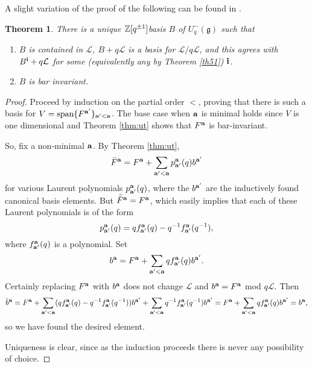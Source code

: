 \documentclass[11pt]{amsart}
\numberwithin{equation}{section}
\newtheorem{Theorem}{Theorem}[section]
\theoremstyle{definition}
\newcommand{\g}{\mathfrak{g}}
\begin{document}
A slight variation of the proof of the following can be found in \cite[Lemma 0.27]{DDPW}.

\begin{Theorem} \label{th:cbe}
There is a unique ${\Bbb Z}[q^{\pm 1}]$basis $B$ of $U_q^-(\g)$ such that
\begin{enumerate}

\item $B$ is contained in $\mathcal{L}$, $B+q\mathcal{L}$ is a basis for $\mathcal{L}/q\mathcal{L}$, and this agrees with $B^{\bf i} + q\mathcal{L}$ for some (equivalently any by Theorem \ref{th51}) ${\bf i}$. 

\item $B$ is bar invariant. 
\end{enumerate}
\end{Theorem}

\begin{proof}
%
Proceed by induction on the partial order $<$, proving that there is such a basis for 
$V= \text{span} \{F^{\bf a'} \}_{{\bf a'}< {\bf a}} $.  The base case when ${\bf a}$ is minimal holds since $V$ is one dimensional and Theorem \ref{thm:ut} shows that $F^{\bf a}$ is bar-invariant. 

So, fix a non-minimal ${\bf a}$. By Theorem \ref{thm:ut},
$$\bar F^{\bf a}= F^{\bf a} + \sum_{{\bf a'} < {\bf a}} p_{\bf a'}^{\bf a}(q)  b^{\bf a'}$$
for various Laurent polynomials $p_{\bf a'}^{\bf a}(q)$,
where the $b^{\bf a'}$ are the inductively found canonical basis elements.
But $\bar{\bar F}^{\bf a}=F^{\bf a}$, which easily implies that
each of these Laurent polynomials is of the form 
$$p_{\bf a'}^{\bf a}(q)  = q {f}_{\bf a'}^{\bf a}(q)- q^{-1} f_{\bf a'}^{\bf a}(q^{-1}),$$
where $f_{\bf a'}^{\bf a}(q) $ is a polynomial. 
Set 
\begin{equation} \label{eq:ba} 
b^{\bf a} = F^{\bf a} + \sum_{{\bf a'} < {\bf a}} q f_{\bf a'}^{\bf a}(q)  b^{\bf a'}.
\end{equation}
Certainly replacing $F^{\bf a}$ with $b^{\bf a}$ does not change $\mathcal{L}$ and $b^{\bf a}= F^{\bf a}$ mod $q \mathcal{L}$. Then
$$\bar b^{\bf a} =  F^{\bf a} + \sum_{{\bf a'} <{\bf a}} (q {f}_{\bf a'}^{\bf a}(q)- q^{-1} f_{\bf a'}^{\bf a}(q^{-1})) b^{\bf a'} + \sum_{{\bf a'} < {\bf a}} q^{-1} f_{\bf a'}^{\bf a}(q^{-1})  b^{\bf a'}
= F^{\bf a} + \sum_{{\bf a'} < {\bf a}} q f_{\bf a'}^{\bf a}(q)  b^{\bf a'} = b^{\bf a},$$
so we have found the desired element.

Uniqueness is clear, since as the induction proceeds there is never any possibility of choice. 
\end{proof}
\end{document}
